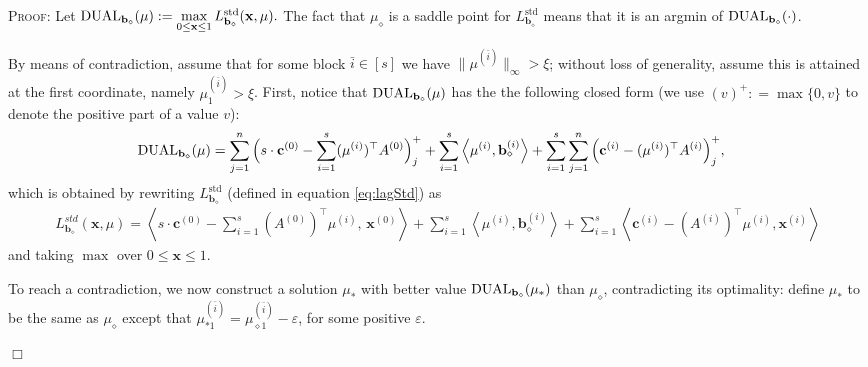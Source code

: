 \documentclass{article}
\newcommand{\e}{\varepsilon}
\newcommand{\cv}[0]{\mathbf{c}}
\newcommand{\xv}[0]{\mathbf{x}}
\newcommand{\bv}[0]{\mathbf{b}}
\newenvironment{proof}[1][]
   {\textsc{Proof#1: }}
   {\hfill$\Box$\smallskip}
\newcommand{\iprod}[2]{\left\langle {#1}, {#2} \right\rangle}
\newcommand{\LAG}{\textup{DUAL}}
\begin{document}
\begin{proof}
   Let $\LAG_{\bv_\diamond}(\mu) := \max\limits_{0 \leq \xv \leq 1} L^{\text{std}}_{\bv_{\diamond}}(\xv,\mu).$ The fact that $\mu_{\diamond}$ is a saddle point for $L^{\text{std}}_{\bv_{\diamond}}$ means that it is an argmin of $\LAG_{\bv_\diamond}(\cdot)$. 

   By means of contradiction, assume that for some block $\bar{i} \in [s]$ we have $\|\mu^{(\bar{i})}\|_{\infty} > \xi$; without loss of generality, assume this is attained at the first coordinate, namely $\mu^{(\bar{i})}_1 > \xi$. First, notice that $\LAG_{\bv_\diamond}(\mu)$ has the the following closed form (we use $(v)^+ : = \max\{0, v\}$ to denote the positive part of a value $v$):
\begin{align}
         \LAG_{\bv_\diamond}(\mu) & = \sum_{j = 1}^n  \Big(s\cdot\cv^{(0)} - \sum_{i=1}^{s} (\mu^{(i)})^{\top} A^{(0)} \Big)^+_j + \sum_{i=1}^{s} \iprod{\mu^{(i)}}{\bv^{(i)}_{\diamond}} + \sum_{i = 1}^s \sum_{j = 1}^n \Big(\cv^{(i)} - (\mu^{(i)})^{\top} A^{(i)} \Big)^+_j, \label{eq:dualClosed}
\end{align}
    which is obtained by rewriting $L^{\text{std}}_{\bv_{\diamond}}$ (defined in equation \eqref{eq:lagStd}) as
    \begin{align*}
    L^{std}_{\bv_{\diamond}}(\xv,\mu) = \iprod{s \cdot \cv^{(0)} - \sum_{i = 1}^s (A^{(0)})^{\top} \mu^{(i)}}{\,\xv^{(0)}} + \sum_{i=1}^{s} \iprod{\mu^{(i)}}{\bv^{(i)}_{\diamond}} + \sum_{i = 1}^s \iprod{\cv^{(i)} - (A^{(i)})^{\top} \mu^{(i)}}{\xv^{(i)}}
    \end{align*}
    and taking $\max$ over $0 \le \xv \le 1$.

    To reach a contradiction, we now construct a solution $\mu_{*}$ with better value $\LAG_{\bv_\diamond}(\mu_*)$ than $\mu_{\diamond}$, contradicting its optimality: define $\mu_*$ to be the same as $\mu_{\diamond}$ except that $\mu^{(\bar{i})}_{*1} = \mu^{(\bar{i})}_{\diamond 1} - \e$, for some positive $\e$. 


\end{proof}
\end{document}
